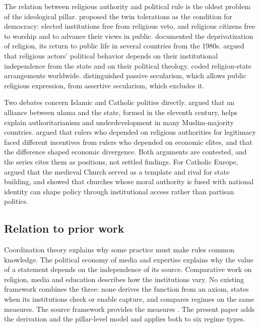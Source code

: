 \documentclass[11pt,letterpaper]{article}
\theoremstyle{definition}
\theoremstyle{remark}
\begin{document}
The relation between religious authority and political rule is the oldest problem of the ideological pillar. \citet{stepan2000} proposed the twin tolerations as the condition for democracy: elected institutions free from religious veto, and religious citizens free to worship and to advance their views in public. \citet{casanova1994} documented the deprivatization of religion, its return to public life in several countries from the 1980s. \citet{philpott2007} argued that religious actors' political behavior depends on their institutional independence from the state and on their political theology. \citet{fox2008} coded religion-state arrangements worldwide. \citet{kuru2009} distinguished passive secularism, which allows public religious expression, from assertive secularism, which excludes it.

Two debates concern Islamic and Catholic polities directly. \citet{kuru2019} argued that an alliance between ulama and the state, formed in the eleventh century, helps explain authoritarianism and underdevelopment in many Muslim-majority countries. \citet{rubin2017} argued that rulers who depended on religious authorities for legitimacy faced different incentives from rulers who depended on economic elites, and that the difference shaped economic divergence. Both arguments are contested, and the series cites them as positions, not settled findings. For Catholic Europe, \citet{grzymala2023} argued that the medieval Church served as a template and rival for state building, and \citet{grzymala2015} showed that churches whose moral authority is fused with national identity can shape policy through institutional access rather than partisan politics.

\subsection{Relation to prior work}

Coordination theory \citep{lewis1969,schelling1960,aumann1976,chwe2001} explains why some practice must make rules common knowledge. The political economy of media and expertise \citep{besley2006,gentzkow2006,carpenter2010} explains why the value of a statement depends on the independence of its source. Comparative work on religion, media and education describes how the institutions vary. No existing framework combines the three: none derives the function from an axiom, states when its institutions check or enable capture, and compares regimes on the same measures. The source framework provides the measures \citep{largo2026hbs}. The present paper adds the derivation and the pillar-level model and applies both to six regime types.
\end{document}
